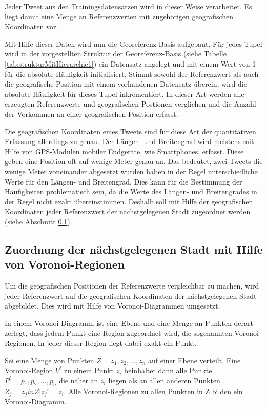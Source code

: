 			Jeder Tweet aus den Trainingsdatensätzen wird in dieser Weise verarbeitet. 
			Es liegt damit eine Menge an Referenzwerten mit zugehörigen geografischen Koordinaten vor.

			Mit Hilfe dieser Daten wird nun die Georeferenz-Basis aufgebaut. 
			Für jedes Tupel wird in der vorgestellten Struktur der Georeferenz-Basis (siehe Tabelle \ref{tab:strukturMitHierarchie1}) ein Datensatz angelegt und mit einem Wert von 1 für die absolute Häufigkeit initialisiert. 
			Stimmt sowohl der Referenzwert als auch die geografische Position mit einem vorhandenen Datensatz überein, wird die absolute Häufigkeit für dieses Tupel inkrementiert.
			In dieser Art werden alle erzeugten Referenzwerte und geografischen Postionen verglichen und die Anzahl der Vorkommen an einer geografischen Position erfasst.

			Die geografischen Koordinaten eines Tweets sind für diese Art der quantitativen Erfassung allerdings zu genau. 
			Der Längen- und Breitengrad wird meistens mit Hilfe von GPS-Modulen mobiler Endgeräte, wie Smartphones, erfasst.
			Diese geben eine Position oft auf wenige Meter genau an.
			Das bedeutet, zwei Tweets die wenige Meter voneinander abgesetzt wurden haben in der Regel unterschiedliche Werte für den Längen- und Breitengrad.
			Dies kann für die Bestimmung der Häufigkeiten problematisch sein, da die Werte des Längen- und Breitengrades in der Regel nicht exakt übereinstimmen.
			Deshalb soll mit Hilfe der geografischen Koordinaten jeder Referenzwert der nächstgelegenen Stadt zugeordnet werden (siehe Abschnitt \ref{sub:Stadtbestimmen}).

		\subsection{Zuordnung der nächstgelegenen Stadt mit Hilfe von Voronoi-Regionen} \label{sub:Stadtbestimmen} 

			Um die geografischen Positionen der Referenzwerte vergleichbar zu machen, wird jeder Referenzwert auf die geografischen Koordinaten der nächstgelegenen Stadt abgebildet.
			Dies wird mit Hilfe von Voronoi-Diagrammen umgesetzt.

			In einem Voronoi-Diagramm ist eine Ebene und eine Menge an Punkten derart zerlegt, dass jedem Punkt eine Region zugeordnet wird, die sogenannten Voronoi-Regionen.
			In jeder dieser Region liegt dabei exakt ein Punkt.  

			Sei eine Menge von Punkten $Z = {z_1,z_2,...,z_n}$ auf einer Ebene verteilt.
			Eine Voronoi-Region $V^i$ zu einem Punkt $z_i$ beinhaltet dann alle Punkte $P^i={p_1,p_2,...,p_n}$ die näher an $z_i$ liegen als an allen anderen Punkten $Z_j={z_j in Z|z_j!=z_i}$.
			Alle Voronoi-Regionen zu allen Punkten in Z bilden ein Voronoi-Diagramm.

